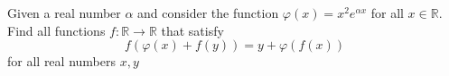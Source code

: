 \documentclass[11pt]{scrartcl}
\begin{document}
\begin{itemize}[label=,itemsep=0.4em,leftmargin=0em]
\begin{comment}
        The satisfied functions are $\boxed{f(x) = 2-x, \xr}$ and $\boxed{f(x) = x, \xr}$.

    \end{comment}
    \begin{btvn}
        Given a real number \(\alpha\) and consider the function \(\varphi(x) = x^2 e^{\alpha x}\) for all \(x \in \mathbb{R}\).
        Find all functions $f: \mathbb{R} \to \mathbb{R}$ that satisfy
            $$
            f(\varphi(x)+f(y))=y+\varphi(f(x))
            $$
            for all real numbers $x, y$
    \end{btvn}
   
    \begin{comment}
        Let \( P(x,y) \) denote substitution into \( (1) \).

        \[ P(0,y) \ra f(f(y)) = y + \varphi(f(0)), \xr \]
        From this, it is straightforward to deduce that \( f \) is bijective. Thus, there exists \( c \) such that \( f(c) = 0 \).

        \[ P(c,f(y)) \ra f(\varphi(c) + f(f(y))) = f(y). \]
        Since \( f \) is bijective, \( \varphi(c) + f(f(y)) = y \ra \varphi(c) + y + \varphi(f(0)) = y \ra \varphi(c) + \varphi(0) = 0 \).

        Since \( \varphi: \mathbb{R} \to [0,+\infty) \), we conclude \( f(0) = c = 0 \).

        From \( (1) \), substituting \( P(x,0) \):
        \[ f(\varphi(x)) = \varphi(f(x)), \xr \]
        we deduce \( f(f(y)) = y \). Since \( \varphi(x) \) is continuous over \( \mathbb{R} \) and takes values in \( [0,+\infty) \), \( f(x) \geq 0 \) for \( x \geq 0 \). Rewrite \( P(x,f(y)) \):
        \[ f(\varphi(x) + y) = f(y) + f(\varphi(x)) \ra f(x + y) = f(x) + f(y), \quad \forall x \geq 0, y \in \mathbb{R}. \]

        For \( x, y \in \mathbb{R} \), choose \( z > \max\{0, -y\} \), we have:
        \[ f(x + y) + f(z) = f(x + y + z) = f(x) + f(y + z) = f(x) + f(y) + f(z). \]
        Thus, \( f \) is additive over \( \mathbb{R} \). We state and prove the following lemma:

        \begin{lemma}
        Consider a function \( f: \mathbb{R} \to \mathbb{R} \) bounded on \( [a,b] \) and satisfying
        \[ f(x + y) = f(x) + f(y), \xyr \]
        Then \( f \) is linear over \( \mathbb{R} \).
        \end{lemma}
        \begin{pro}
            Assume there exists a function \( f: \mathbb{R} \ra \mathbb{R} \) bounded on the interval \( [a, b] \) and satisfying the condition


\end{comment}
\end{itemize}
\end{document}
